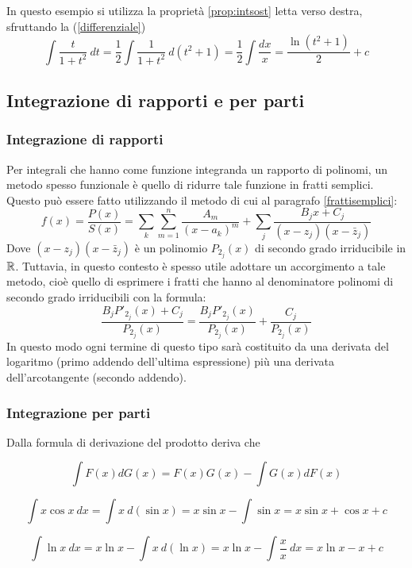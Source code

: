 \begin{examp}
	In questo esempio si utilizza la proprietà \ref{prop:intsost} letta verso destra, sfruttando la (\ref{differenziale})
	\[
		\int \frac{t}{1+t^2}~dt=\frac{1}{2}\int\frac{1}{1+t^2}~d(t^2+1)=\frac{1}{2}\int\frac{dx}{x}=\frac{\ln(t^2+1)}{2}+c
	\]
\end{examp}


\subsection{Integrazione di rapporti e per parti}

\subsubsection{Integrazione di rapporti}
Per integrali che hanno come funzione integranda un rapporto di polinomi, un metodo spesso funzionale è quello di ridurre tale funzione in fratti semplici. Questo può essere fatto utilizzando il metodo di cui al paragrafo \vref{frattisemplici}:
\[
	f(x)=\frac{P(x)}{S(x)}=\sum_k\sum_{m=1}^n \frac{A_m}{(x-a_k)^m}+\sum_j \frac{B_jx+C_j}{(x-z_j)(x-\bar z_j)}
\]
Dove $(x-z_j)(x-\bar z_j)$ è un polinomio $P_{2_j}(x)$ di secondo grado irriducibile in $\mathbb{R}$. Tuttavia, in questo contesto è spesso utile adottare un accorgimento a tale metodo, cioè quello di esprimere i fratti che hanno al denominatore polinomi di secondo grado irriducibili con la formula:
\[
	\frac{B_jP'_{2_j}(x)+C_j}{P_{2_j}(x)}=\frac{B_jP'_{2_j}(x)}{P_{2_j}(x)}+\frac{C_j}{P_{2_j}(x)}
\]
In questo modo ogni termine di questo tipo sarà costituito da una derivata del logaritmo (primo addendo dell'ultima espressione) più una derivata dell'arcotangente (secondo addendo).

\subsubsection{Integrazione per parti}
Dalla formula di derivazione del prodotto deriva che
\begin{prop}
	\[
		\int F(x)dG(x)=F(x)G(x)-\int G(x)dF(x)
	\]
\end{prop}

\begin{examp}
	\[
		\int x\cos x~dx=\int x~d(\sin x)=x\sin x-\int\sin x=x\sin x+\cos x +c
	\]
\end{examp}
\begin{examp}
	\[
		\int\ln x~dx=x\ln x-\int x~d(\ln x)=x\ln x-\int \frac{x}{x}~dx=x\ln x-x+c
	\]
\end{examp}
